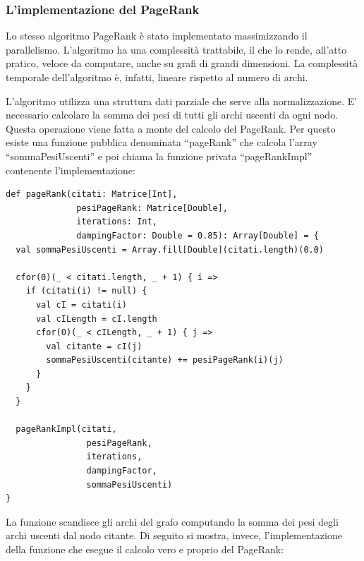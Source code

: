 \documentclass[a4paper, 12pt]{article}
\begin{document}
\subsubsection{L'implementazione del PageRank}
Lo stesso algoritmo PageRank è stato implementato massimizzando il parallelismo. L'algoritmo ha una complessità trattabile, il che lo rende, all'atto pratico, veloce da computare, anche su grafi di grandi dimensioni. La complessità temporale dell'algoritmo è, infatti, lineare rispetto al numero di archi.
\par
L'algoritmo utilizza una struttura dati parziale che serve alla normalizzazione. E' necessario calcolare la somma dei pesi di tutti gli archi uscenti da ogni nodo. Questa operazione viene fatta a monte del calcolo del PageRank. Per questo esiste una funzione pubblica denominata ``pageRank'' che calcola l'array ``sommaPesiUscenti'' e poi chiama la funzione privata ``pageRankImpl'' contenente l'implementazione:
\begin{lstlisting}[keepspaces=true]
def pageRank(citati: Matrice[Int],
              pesiPageRank: Matrice[Double],
              iterations: Int,
              dampingFactor: Double = 0.85): Array[Double] = {
  val sommaPesiUscenti = Array.fill[Double](citati.length)(0.0)

  cfor(0)(_ < citati.length, _ + 1) { i =>
    if (citati(i) != null) {
      val cI = citati(i)
      val cILength = cI.length
      cfor(0)(_ < cILength, _ + 1) { j =>
        val citante = cI(j)
        sommaPesiUscenti(citante) += pesiPageRank(i)(j)
      }
    }
  }

  pageRankImpl(citati,
                pesiPageRank,
                iterations,
                dampingFactor,
                sommaPesiUscenti)
}
\end{lstlisting}
La funzione scandisce gli archi del grafo computando la somma dei pesi degli archi uscenti dal nodo citante.
Di seguito si mostra, invece, l'implementazione della funzione che esegue il calcolo vero e proprio del PageRank:
\end{document}
